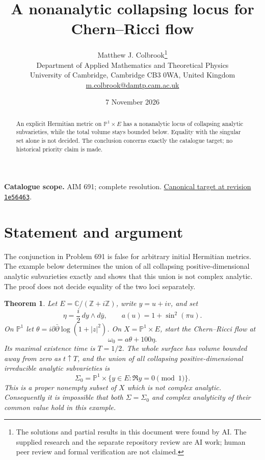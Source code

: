 \documentclass[11pt,a4paper]{article}
\newtheorem{theorem}{Theorem}[section]
\theoremstyle{remark}
\begin{document}
\title{A nonanalytic collapsing locus for Chern--Ricci flow}
\author{Matthew J. Colbrook\thanks{The solutions and partial results in this document were found by AI. The supplied research and the separate repository review are AI work; human peer review and formal verification are not claimed.}\\[4pt]
\small Department of Applied Mathematics and Theoretical Physics\\
\small University of Cambridge, Cambridge CB3 0WA, United Kingdom\\
\small\href{mailto:m.colbrook@damtp.cam.ac.uk}{m.colbrook@damtp.cam.ac.uk}}
\date{7 November 2026}
\maketitle
\begin{abstract}
An explicit Hermitian metric on $\mathbb P^1\times E$ has a nonanalytic locus of collapsing analytic subvarieties, while the total volume stays bounded below. Equality with the singular set alone is not decided. The conclusion concerns exactly the catalogue target; no historical priority claim is made.
\end{abstract}
\noindent\textbf{Catalogue scope.} AIM 691; complete resolution. \href{https://github.com/MColbrook/AIM/blob/1e564633494c109edfd3ec46da1366adcff925a5/problems/691-finite-time-singularities-of-the-chernricci-flow.md}{Canonical target at revision \texttt{1e56463}}.


\section{Statement and argument}
\label{sec:691}

The conjunction in Problem 691 is false for arbitrary initial Hermitian metrics. The example below determines the union of all collapsing positive-dimensional analytic subvarieties exactly and shows that this union is not complex analytic. The proof does not decide equality of the two loci separately.

\begin{theorem}
Let $E=\mathbb C/(\mathbb Z+i\mathbb Z)$, write $y=u+iv$, and set
\[
 \eta=\frac{i}{2}\,dy\wedge d\bar y,\qquad
 a(u)=1+\sin^2(\pi u).
\]
On $\mathbb P^1$ let $\theta=i\partial\bar\partial\log(1+|z|^2)$. On $X=\mathbb P^1\times E$, start the Chern--Ricci flow at
\[
 \omega_0=a\theta+100\eta.
\]
Its maximal existence time is $T=1/2$. The whole surface has volume bounded away from zero as $t\uparrow T$, and the union of all collapsing positive-dimensional irreducible analytic subvarieties is
\[
 \Sigma_0=\mathbb P^1\times\{y\in E:\Re y=0\pmod 1\}.
\]
This is a proper nonempty subset of $X$ which is not complex analytic. Consequently it is impossible that both $\Sigma=\Sigma_0$ and complex analyticity of their common value hold in this example.
\end{theorem}
\end{document}
